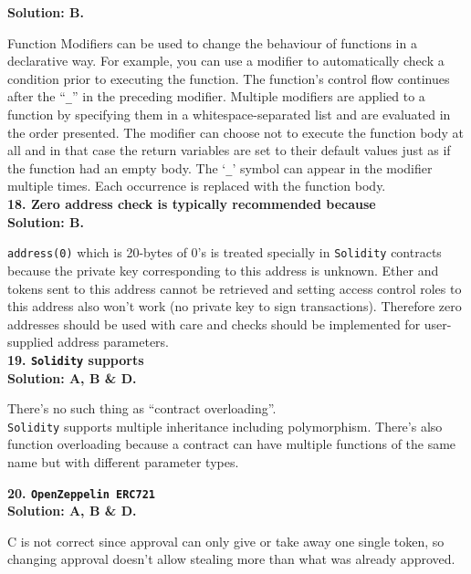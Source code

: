 \textbf{Solution: B.}

Function Modifiers can be used to change the behaviour of functions in a declarative way.
For example, you can use a modifier to automatically check a condition prior to executing the function.
The function's control flow continues after the ``\verb|_|'' in the preceding modifier.
Multiple modifiers are applied to a function by specifying them in a whitespace-separated list and are evaluated in the order presented.
The modifier can choose not to execute the function body at all and in that case the return variables are set to their default values just as if the function had an empty body.
The `\verb|_|' symbol can appear in the modifier multiple times.
Each occurrence is replaced with the function body.\\

\textbf{18. Zero address check is typically recommended because}\label{sec:exam3_q18}\\

\textbf{Solution: B.}

\verb|address(0)| which is 20-bytes of 0's is treated specially in \verb|Solidity| contracts because the private key corresponding to this address is unknown.
Ether and tokens sent to this address cannot be retrieved and setting access control roles to this address also won't work (no private key to sign transactions).
Therefore zero addresses should be used with care and checks should be implemented for user-supplied address parameters.\\

\textbf{19. \texttt{Solidity} supports}\label{sec:exam3_q19}\\

\textbf{Solution: A, B \& D.}

There's no such thing as ``contract overloading''.\\

\verb|Solidity| supports multiple inheritance including polymorphism.
There's also function overloading because a contract can have multiple functions of the same name but with different parameter types.

\textbf{20. \texttt{OpenZeppelin ERC721}}\label{sec:exam3_q20}\\

\textbf{Solution: A, B \& D.}

C is not correct since approval can only give or take away one single token, so changing approval doesn't allow stealing more than what was already approved.\\

